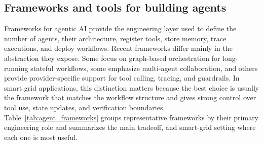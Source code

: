 \documentclass[journal,onecolumn]{IEEEtran} %
\newcommand{\todo}[1]{\color{red}#1\color{black}}
\newcommand{\dani}[1]{\color{blue}#1\color{black}}
\begin{document}
\subsection{Frameworks and tools for building agents}
Frameworks for agentic AI provide the engineering layer used to define the number of agents, their architecture, register tools, store memory, trace executions, and deploy workflows. Recent frameworks differ mainly in the abstraction they expose. Some focus on graph-based orchestration for long-running stateful workflows, some emphasize multi-agent collaboration, and others provide provider-specific support for tool calling, tracing, and guardrails. In smart grid applications, this distinction matters because the best choice is usually the framework that matches the workflow structure and gives strong control over tool use, state updates, and verification boundaries. %
{Table~\ref{tab:agent_frameworks} groups representative frameworks by their primary engineering role and summarizes the main tradeoff, and smart-grid setting where each one is most useful.}

\end{document}
